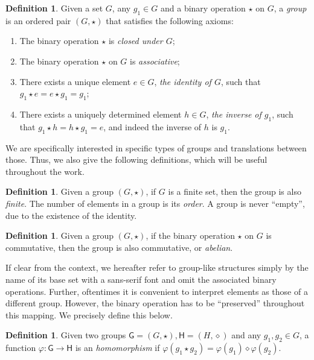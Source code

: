 \documentclass[draft, 12pt, a4paper, oneside]{memoir}
\theoremstyle{definition}
\newtheorem{definition}[theorem]{Definition}
\begin{document}
\begin{definition}
  Given a set $G$, any $g_{1} \in G$ and a binary operation $\star$ on $G$, a \emph{group} is an ordered pair $(G, \star)$ that satisfies the following axioms:
  
  \begin{enumerate}
    \item The binary operation $\star$ is \emph{closed under $G$};
    \item The binary operation $\star$ on $G$ is \emph{associative};
    \item There exists a unique element $e \in G$, \emph{the identity of $G$}, such that $g_{1} \star e = e \star g_{1} = g_{1}$;
    \item There exists a uniquely determined element $h \in G$, \emph{the inverse of $g_{1}$}, such that $g_{1} \star h = h \star g_{1} = e$, and indeed the inverse of $h$ is $g_{1}$.
  \end{enumerate}
\end{definition}

We are specifically interested in specific types of groups and translations between those. Thus, we also give the following definitions, which will be useful throughout the work.

\begin{definition}
  Given a group $(G, \star)$, if $G$ is a finite set, then the group is also \emph{finite}. The number of elements in a group is its \emph{order}. A group is never ``empty'', due to the existence of the identity.
\end{definition}

\begin{definition}
  Given a group $(G, \star)$, if the binary operation $\star$ on $G$ is commutative, then the group is also commutative, or \emph{abelian}.
\end{definition}

If clear from the context, we hereafter refer to group-like structures simply by the name of its base set with a sans-serif font and omit the associated binary operations. Further, oftentimes it is convenient to interpret elements as those of a different group. However, the binary operation has to be ``preserved'' throughout this mapping. We precisely define this below.

\begin{definition}\label{def:ghom}
  Given two groups $\mathsf{G} = (G, \star), \mathsf{H} = (H, \diamond)$ and any $g_{1}, g_{2} \in G$, a function $\varphi : \mathsf{G} \to \mathsf{H}$ is an \emph{homomorphism} if $\varphi(g_{1} \star g_{2}) = \varphi(g_{1}) \diamond \varphi(g_{2})$.
\end{definition}
\end{document}
